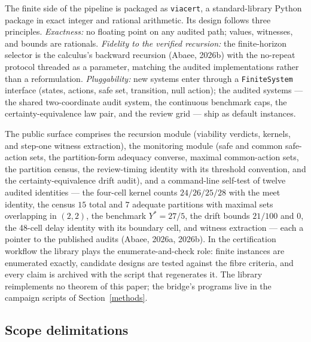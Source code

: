 \documentclass[10pt,twocolumn]{article}
\theoremstyle{plain}
\theoremstyle{definition}
\theoremstyle{remark}
\begin{document}
The finite side of the pipeline is packaged as \texttt{viacert}, a
standard-library Python package in exact integer and rational arithmetic.
Its design follows three principles. \emph{Exactness:} no floating point on
any audited path; values, witnesses, and bounds are rationals.
\emph{Fidelity to the verified recursion:} the finite-horizon selector is the
calculus's backward recursion (Abaee, 2026b) with the no-repeat protocol
threaded as a parameter, matching the audited implementations rather than a
reformulation. \emph{Pluggability:} new systems enter through a
\texttt{FiniteSystem} interface (states, actions, safe set, transition, null
action); the audited systems --- the shared two-coordinate audit system, the
continuous benchmark caps, the certainty-equivalence law pair, and the
review grid --- ship as default instances.

The public surface comprises the recursion module (viability verdicts,
kernels, and step-one witness extraction), the monitoring module (safe and
common safe-action sets, the partition-form adequacy converse, maximal
common-action sets, the partition census, the review-timing identity with
its threshold convention, and the certainty-equivalence drift audit), and a
command-line self-test of twelve audited identities --- the four-cell kernel
counts \(24/26/25/28\) with the meet identity, the census \(15\) total and
\(7\) adequate partitions with maximal sets overlapping in \((2,2)\), the
benchmark \(Y^{*} = 27/5\), the drift bounds \(21/100\) and \(0\), the
48-cell delay identity with its boundary cell, and witness extraction ---
each a pointer to the published audits (Abaee, 2026a, 2026b). In the
certification workflow the library plays the enumerate-and-check role:
finite instances are enumerated exactly, candidate designs are tested
against the fibre criteria, and every claim is archived with the script that
regenerates it. The library reimplements no theorem of this paper; the
bridge's programs live in the campaign scripts of Section~\ref{methods}.

\subsection{Scope delimitations}\label{scope}
\end{document}
